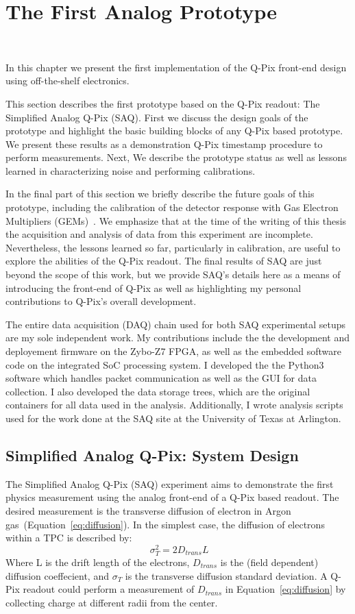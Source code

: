 \chapter{The First Analog Prototype}~\label{chap:saq}

In this chapter we present the first implementation of the Q-Pix front-end design using off-the-shelf electronics.

This section describes the first prototype based on the Q-Pix readout: The Simplified Analog Q-Pix (SAQ).
First we discuss the design goals of the prototype and highlight the basic building blocks of any Q-Pix based prototype.
We present these results as a demonstration Q-Pix timestamp procedure to perform measurements.
Next, We describe the prototype status as well as lessons learned in characterizing noise and performing calibrations.

In the final part of this section we briefly describe the future goals of this prototype, including the calibration of the detector response with Gas Electron Multipliers (GEMs)~\citep{SAULI20162}.
We emphasize that at the time of the writing of this thesis the acquisition and analysis of data from this experiment are incomplete.
Nevertheless, the lessons learned so far, particularly in calibration, are useful to explore the abilities of the Q-Pix readout.
The final results of SAQ are just beyond the scope of this work, but we provide SAQ's details here as a means of introducing the front-end of Q-Pix as well as highlighting my personal contributions to Q-Pix's overall development.

The entire data acquisition (DAQ) chain used for both SAQ experimental setups are my sole independent work.
My contributions include the the development and deployement firmware on the Zybo-Z7 FPGA, as well as the embedded software code on the integrated SoC processing system.
I developed the the Python3 software which handles packet communication as well as the GUI for data collection.
I also developed the data storage trees, which are the original containers for all data used in the analysis. 
Additionally, I wrote analysis scripts used for the work done at the SAQ site at the University of Texas at Arlington.

\section{Simplified Analog Q-Pix: System Design}

The Simplified Analog Q-Pix (SAQ) experiment aims to demonstrate the first physics measurement using the analog front-end of a Q-Pix based readout.
The desired measurement is the transverse diffusion of electron in Argon gas~(Equation~\ref{eq:diffusion}).
In the simplest case, the diffusion of electrons within a TPC is described by:
\begin{equation}~\label{eq:diffusion}
 \sigma^{2}_{T} = 2D_{trans}L
\end{equation}
Where L is the drift length of the electrons, $D_{trans}$ is the (field dependent) diffusion coeffecient, and $\sigma_{T}$ is the transverse diffusion standard deviation.
A Q-Pix readout could perform a measurement of $D_{trans}$ in Equation~\ref{eq:diffusion} by collecting charge at different radii from the center.

